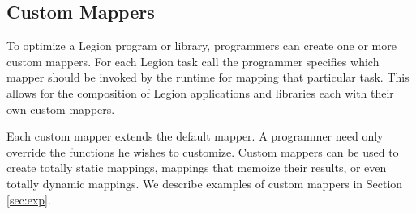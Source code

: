 \subsection{Custom Mappers}
\label{sec:custommap}
To optimize a Legion program or library, programmers can create one or more custom mappers.  
For each Legion task call the programmer specifies which mapper should be invoked by the runtime for
mapping that particular task.  This allows for the composition of Legion applications and libraries
each with their own custom mappers.

Each custom mapper extends the default mapper.  A programmer need only override the functions 
he wishes to customize.  Custom mappers can be used to create totally static mappings, 
mappings that memoize their results, or even totally dynamic mappings.  We describe examples of 
custom mappers in Section \ref{sec:exp}.




